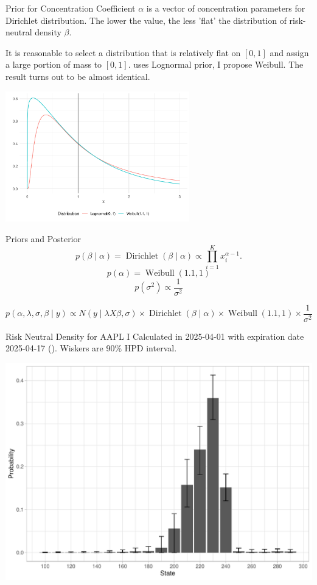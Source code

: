 \documentclass[10pt,aspectratio=43]{beamer}
\begin{document}
\begin{frame}{Prior for Concentration Coefficient}
    $\alpha$ is a vector of concentration parameters for Dirichlet distribution. The lower the value, the less 'flat' the distribution of risk-neutral density $\beta$.
    
    It is reasonable to select a distribution that is relatively flat on $[0,1]$ and assign a large portion of mass to $[0,1]$. \cite{fisherSimplexRegression2016} uses Lognormal prior, I propose Weibull. The result turns out to be almost identical.

    \includegraphics[width=0.6\textwidth]{prior_difference.pdf}

\end{frame}

\begin{frame}{Priors and Posterior}
     \[p(\beta\mid \alpha)=\operatorname{Dirichlet}(\beta\mid \alpha)\propto \prod_{i=1}^{K}x_{i}^{\alpha-1}.\]
    \[p(\alpha)=\operatorname{Weibull}(1.1,1)\]
    \[p(\sigma^2)\propto \frac{1}{\sigma^2}\]

    \[p(\alpha,\lambda,\sigma,\beta\mid y)\propto N(y\mid \lambda X\beta,\sigma)\times\operatorname{Dirichlet}(\beta\mid \alpha)\times \operatorname{Weibull}(1.1,1)\times \frac{1}{\sigma^2}\]

\end{frame}





\begin{frame}{Risk Neutral Density for AAPL I}
    Calculated in 2025-04-01 with expiration date 2025-04-17 (). Wiskers are 90\% HPD interval.
    \begin{center}
        \includegraphics[width=0.8\linewidth]{betas_01_1.pdf}
    \end{center}
    
\end{frame}
\end{document}

